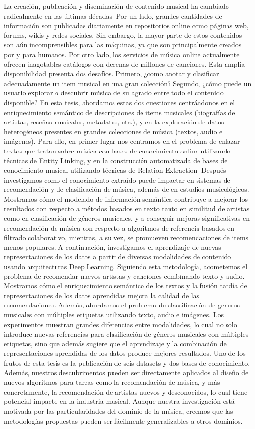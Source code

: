 La creación, publicación y diseminación de contenido musical ha cambiado radicalmente en las últimas décadas. Por un lado, grandes cantidades de información son publicadas diariamente en repositorios online como páginas web, forums, wikis y redes sociales. Sin embargo, la mayor parte de estos contenidos son aún incomprensibles para las máquinas, ya que son principalmente creados por y para humanos. Por otro lado, los servicios de música online actualmente ofrecen inagotables catálogos con decenas de millones de canciones. Esta amplia disponibilidad presenta dos desafíos. Primero, ¿como anotar y clasificar adecuadamente un item musical en una gran colección? Segundo, ¿cómo puede un usuario explorar o descubrir música de su agrado entre todo el contenido disponible? En esta tesis, abordamos estas dos cuestiones centrándonos en el enriquecimiento semántico de descripciones de items musicales (biografías de artistas, reseñas musicales, metadatos, etc.), y en la exploración de datos heterogéneos presentes en grandes colecciones de música (textos, audio e imágenes). Para ello, en primer lugar nos centramos en el problema de enlazar textos que tratan sobre música con bases de conocimiento online utilizando técnicas de Entity Linking, y en la construcción automatizada de bases de conocimiento musical utilizando técnicas de Relation Extraction. Después investigamos como el conocimiento extraído puede impactar en sistemas de recomendación y de clasificación de música, además de en estudios musicológicos. Mostramos cómo el modelado de información semántica contribuye a mejorar los resultados con respecto a métodos basados en texto tanto en similitud de artistas como en clasificación de géneros musicales, y a conseguir mejoras significativas en recomendación de música con respecto a algoritmos de referencia basados en filtrado colaborativo, mientras, a su vez, se promueven recomendaciones de items menos populares. A continuación, investigamos el aprendizaje de nuevas representaciones de los datos a partir de diversas modalidades de contenido usando arquitecturas Deep Learning. Siguiendo esta metodología, acometemos el problema de recomendar nuevos artistas y canciones combinando texto y audio. Mostramos cómo el enriquecimiento semántico de los textos y la fusión tardía de representaciones de los datos aprendidas mejora la calidad de las recomendaciones. Además, abordamos el problema de classificación de generos musicales con múltiples etiquetas utilizando texto, audio e imágenes. Los experimentos muestran grandes diferencias entre modalidades, lo cual no solo introduce nuevas referencias para clasificación de géneros musicales con múltiples etiquetas, sino que además sugiere que el aprendizaje y la combinación de representaciones aprendidas de los datos produce mejores resultados. Uno de los frutos de esta tesis es la publicación de seis datasets y dos bases de conocimiento. Además, nuestros descubrimentos pueden ser directamente aplicados al diseño de nuevos algoritmos para tareas como la recomendación de música, y más concretamente, la recomendación de artistas nuevos y desconocidos, lo cual tiene potencial impacto en la industria musical. Aunque nuestra investigación está motivada por las particularidades del dominio de la música, creemos que las metodologías propuestas pueden ser fácilmente generalizables a otros dominios.